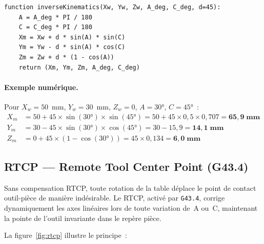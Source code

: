 \documentclass[12pt,a4paper]{report}
\newcommand{\code}[1]{\texttt{\small #1}}
\begin{document}
\begin{lstlisting}[caption={Pseudocode --- cinématique inverse Trunnion.}, label={alg:kin_inv}]
function inverseKinematics(Xw, Yw, Zw, A_deg, C_deg, d=45):
    A = A_deg * PI / 180
    C = C_deg * PI / 180
    Xm = Xw + d * sin(A) * sin(C)
    Ym = Yw - d * sin(A) * cos(C)
    Zm = Zw + d * (1 - cos(A))
    return (Xm, Ym, Zm, A_deg, C_deg)
\end{lstlisting}

\paragraph{Exemple numérique.} Pour $X_w = 50$~mm, $Y_w = 30$~mm, $Z_w = 0$, $A = 30°$, $C = 45°$~:
\begin{align*}
X_m &= 50 + 45 \times \sin(30°) \times \sin(45°) = 50 + 45 \times 0{,}5 \times 0{,}707 = \mathbf{65{,}9\;\text{mm}} \\
Y_m &= 30 - 45 \times \sin(30°) \times \cos(45°) = 30 - 15{,}9 = \mathbf{14{,}1\;\text{mm}} \\
Z_m &= 0 + 45 \times (1 - \cos(30°)) = 45 \times 0{,}134 = \mathbf{6{,}0\;\text{mm}}
\end{align*}

\subsection{RTCP --- Remote Tool Center Point (G43.4)}

Sans compensation RTCP, toute rotation de la table déplace le point de contact outil-pièce de manière indésirable. Le RTCP, activé par \code{G43.4}, corrige dynamiquement les axes linéaires lors de toute variation de~A ou~C, maintenant la pointe de l'outil invariante dans le repère pièce.

La figure~\ref{fig:rtcp} illustre le principe~:
\end{document}
